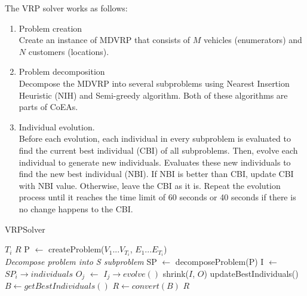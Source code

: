 \documentclass[conference]{IEEEtran}
\begin{document}
The VRP solver works as follows:
\begin{enumerate}
	\item Problem creation \\
	Create an instance of MDVRP that consists of $M$ vehicles (enumerators) and $N$ customers (locations).
	\item Problem decomposition \\
	Decompose the MDVRP into several subproblems using Nearest Insertion Heuristic (NIH) and Semi-greedy algorithm. Both of these algorithms are parts of CoEAs. 
	\item Individual evolution. \\
	Before each evolution, each individual in every subproblem is evaluated to find the current best individual (CBI) of all subproblems. Then, evolve each individual to generate new individuals. Evaluates these new individuals to find the new best individual (NBI). If NBI is better than CBI, update CBI with NBI value. Otherwise, leave the CBI as it is. Repeat the evolution process until it reaches the time limit of 60 seconds or 40 seconds if there is no change happens to the CBI.    
\end{enumerate}


\begin{algorithm}[!]
	\caption{VRPSolver}
	\label{alg:vrp-solver}
	\begin{algorithmic}[1]
		\renewcommand{\algorithmicrequire}{\textbf{Input:}}
		\renewcommand{\algorithmicensure}{\textbf{Output:}}
		\REQUIRE $T_i$
		\ENSURE  $R$
		\STATE P $\leftarrow$ createProblem($V_1...V_{T_i}$, $E_1...E_{T_i}$)
		\\ \textit{Decompose problem into S subproblem}
		\STATE SP $\leftarrow$ decomposeProblem(P)
				\STATE I $\leftarrow$ $SP_i \rightarrow individuals$
					\STATE $O_j$ $\leftarrow$ $I_j \rightarrow evolve()$
				\ENDFOR
				\STATE shrink($I$, $O$)
			\ENDFOR
			\STATE updateBestIndividuals()
		\ENDWHILE
		\STATE $B \leftarrow getBestIndividuals()$ 
		\STATE $R \leftarrow convert(B)$ 
		\RETURN $R$
	\end{algorithmic}
\end{algorithm}


\end{document}
